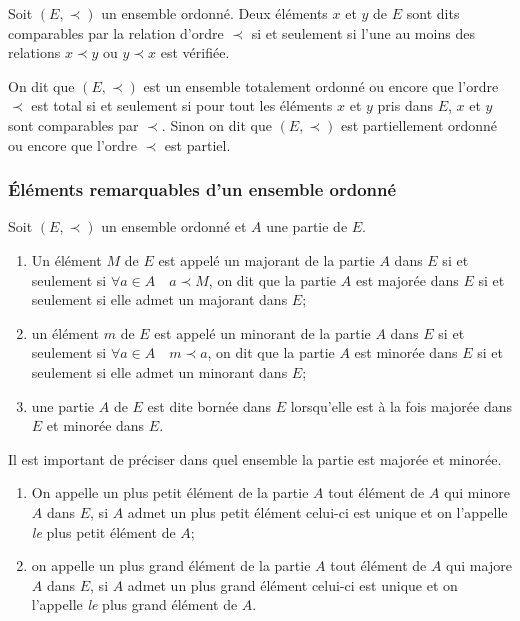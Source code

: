 \begin{defdef}
  Soit \((E, \prec)\) un ensemble ordonné. Deux éléments \(x\) et \(y\) de 
  \(E\) sont dits comparables par la relation d'ordre \(\prec\) si et 
  seulement si l'une au moins des relations \(x \prec y\) ou \(y \prec x\) est 
  vérifiée.
\end{defdef}

\begin{defdef}
  On dit que \((E, \prec)\) est un ensemble totalement ordonné ou encore que 
  l'ordre \(\prec\) est total si et seulement si pour tout les éléments \(x\) 
  et \(y\) pris dans \(E\), \(x\) et \(y\) sont comparables par \(\prec\). 
  Sinon on dit que \((E, \prec)\) est partiellement ordonné ou encore que 
  l'ordre \(\prec\) est partiel.
\end{defdef}

\subsubsection{Éléments remarquables d'un ensemble ordonné}
\label{chap3-subsubsec:elementremarquables}

Soit \((E,\prec)\) un ensemble ordonné et \(A\) une partie de \(E\).
\begin{defdef}
  \begin{enumerate}
    \item Un élément \(M\) de \(E\) est appelé un majorant de la partie 
      \(A\) dans \(E\) si et seulement si \(\forall a \in A \quad a \prec 
      M\), on dit que la partie \(A\) est majorée dans \(E\) si et 
      seulement si elle admet un majorant dans \(E\);
    \item un élément \(m\) de \(E\) est appelé un minorant de la partie 
      \(A\) dans \(E\) si et seulement si \(\forall a \in A \quad m \prec 
      a\), on dit que la partie \(A\) est minorée dans \(E\) si et 
      seulement si elle admet un minorant dans \(E\);
    \item une partie \(A\) de \(E\) est dite bornée dans \(E\) lorsqu'elle 
      est à la fois majorée dans \(E\) et minorée dans \(E\).
  \end{enumerate}
  Il est important de préciser dans quel ensemble la partie est majorée et 
  minorée.
\end{defdef}

\begin{defdef}
  \begin{enumerate}
    \item On appelle un plus petit élément de la partie \(A\) tout élément 
      de \(A\) qui minore \(A\) dans \(E\), si \(A\) admet un plus petit 
      élément celui-ci est unique et on l'appelle \emph{le} plus petit 
      élément de \(A\);
    \item on appelle un plus grand élément de la partie \(A\) tout élément 
      de \(A\) qui majore \(A\) dans \(E\), si \(A\) admet un plus grand 
      élément celui-ci est unique et on l'appelle \emph{le} plus grand 
      élément de \(A\).
  \end{enumerate}
\end{defdef}

